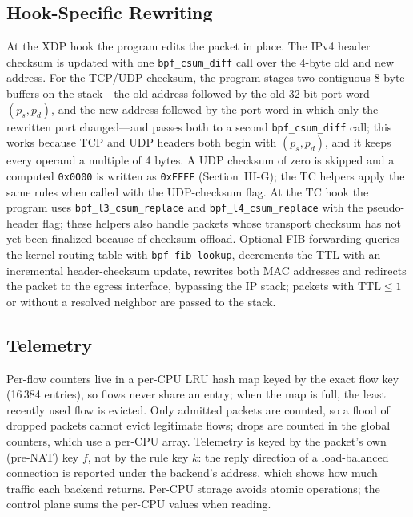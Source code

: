 \documentclass[conference]{IEEEtran}
\begin{document}
\subsection{Hook-Specific Rewriting}
At the XDP hook the program edits the packet in place. The IPv4 header
checksum is updated with one \texttt{bpf\_csum\_diff} call over the 4-byte old
and new address. For the TCP/UDP checksum, the program stages two contiguous
8-byte buffers on the stack---the old address followed by the old 32-bit port
word $(p_s,p_d)$, and the new address followed by the port word in which only
the rewritten port changed---and passes both to a second
\texttt{bpf\_csum\_diff} call; this works because TCP and UDP headers both
begin with $(p_s,p_d)$, and it keeps every operand a multiple of 4 bytes.
A UDP checksum of zero is skipped and a computed \texttt{0x0000} is written as
\texttt{0xFFFF} (Section~III-G); the TC helpers apply the same rules when
called with the UDP-checksum flag. At the TC hook the program uses \texttt{bpf\_l3\_csum\_replace} and
\texttt{bpf\_l4\_csum\_replace} with the pseudo-header flag; these helpers also
handle packets whose transport checksum has not yet been finalized because of
checksum offload. Optional FIB forwarding queries the kernel routing table
with \texttt{bpf\_fib\_lookup}, decrements the TTL with an incremental
header-checksum update, rewrites both MAC addresses and redirects the packet
to the egress interface, bypassing the IP stack; packets with
$\mathrm{TTL}\le1$ or without a resolved neighbor are passed to the stack.

\subsection{Telemetry}
Per-flow counters live in a per-CPU LRU hash map keyed by the exact flow key
(16\,384 entries), so flows never share an entry; when the map is full, the
least recently used flow is evicted. Only admitted packets are counted, so a
flood of dropped packets cannot evict legitimate flows; drops are counted in
the global counters, which use a per-CPU array. Telemetry is keyed by the
packet's own (pre-NAT) key $f$, not by the rule key $k$: the reply direction
of a load-balanced connection is reported under the backend's address, which
shows how much traffic each backend returns. Per-CPU storage avoids atomic
operations; the control plane sums the per-CPU values when reading.
\end{document}
